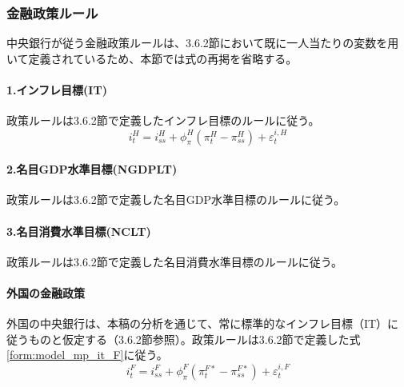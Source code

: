 \subsubsection{金融政策ルール}
\label{sec:model_final_equations_policy_monetary}
中央銀行が従う金融政策ルールは、3.6.2節において既に一人当たりの変数を用いて定義されているため、本節では式の再掲を省略する。

\paragraph{1.インフレ目標(IT)}\label{sec:model_final_equations_policy_monetary_it}
政策ルールは3.6.2節で定義したインフレ目標のルールに従う。
\begin{equation}
i_t^H=i_{ss}^H+\phi_\pi^H(\pi_t^H-\pi_{ss}^H)+\varepsilon_t^{i,H}
\label{form:model_final_equations_mp_it_h}
\end{equation}

\paragraph{2.名目GDP水準目標(NGDPLT)}\label{sec:model_final_equations_policy_monetary_ngdplt}
政策ルールは3.6.2節で定義した名目GDP水準目標のルールに従う。

\paragraph{3.名目消費水準目標(NCLT)}\label{sec:model_final_equations_policy_monetary_nclt}
政策ルールは3.6.2節で定義した名目消費水準目標のルールに従う。

\paragraph{外国の金融政策}\label{sec:model_final_equations_policy_monetary_foreign}
外国の中央銀行は、本稿の分析を通じて、常に標準的なインフレ目標（IT）に従うものと仮定する（3.6.2節参照）。政策ルールは3.6.2節で定義した式\eqref{form:model_mp_it_F}に従う。
\begin{equation}
i_t^F=i_{ss}^F+\phi_\pi^F(\pi_t^{F*}-\pi_{ss}^{F*})+\varepsilon_t^{i,F}
\label{form:model_final_equations_mp_it_f}
\end{equation}